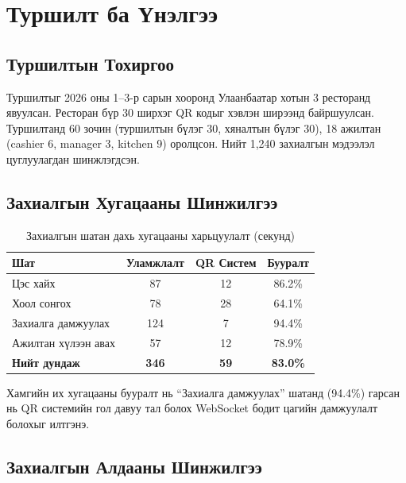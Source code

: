 \documentclass[12pt,a4paper]{article}
\begin{document}
\section{Туршилт ба Үнэлгээ}
\label{sec:eval}

\subsection{Туршилтын Тохиргоо}

Туршилтыг 2026 оны 1--3-р сарын хооронд Улаанбаатар хотын
3 ресторанд явуулсан. Ресторан бүр 30 ширхэг QR кодыг хэвлэн
ширээнд байршуулсан. Туршилтанд 60 зочин (туршилтын бүлэг 30,
хяналтын бүлэг 30), 18 ажилтан (cashier 6, manager 3, kitchen 9)
оролцсон. Нийт 1,240 захиалгын мэдээлэл цуглуулагдан шинжлэгдсэн.

\subsection{Захиалгын Хугацааны Шинжилгээ}

\begin{table}[H]
\caption{Захиалгын шатан дахь хугацааны харьцуулалт (секунд)}
\label{tab:timedetail}
\centering
\begin{tabularx}{\textwidth}{@{}p{4.2cm}ccc@{}}
\toprule
\textbf{Шат} & \textbf{Уламжлалт} & \textbf{QR Систем} & \textbf{Бууралт} \\
\midrule
Цэс хайх                & 87  & 12  & 86.2\% \\
Хоол сонгох             & 78  & 28  & 64.1\% \\
Захиалга дамжуулах      & 124 & 7   & 94.4\% \\
Ажилтан хүлээн авах     & 57  & 12  & 78.9\% \\
\midrule
\textbf{Нийт дундаж}    & \textbf{346} & \textbf{59} & \textbf{83.0\%} \\
\bottomrule
\end{tabularx}
\end{table}

Хамгийн их хугацааны бууралт нь ``Захиалга дамжуулах'' шатанд
(94.4\%) гарсан нь QR системийн гол давуу тал болох WebSocket
бодит цагийн дамжуулалт болохыг илтгэнэ.

\subsection{Захиалгын Алдааны Шинжилгээ}
\end{document}
